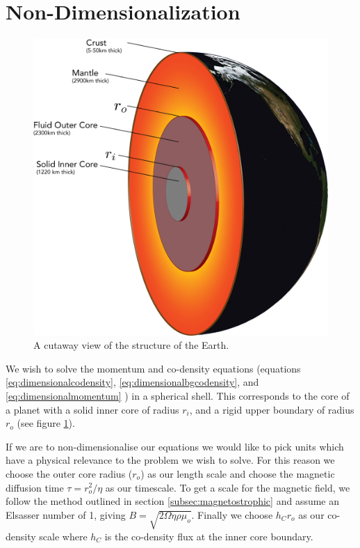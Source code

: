 \section{Non-Dimensionalization}
\begin{figure}
	\centering
	\noindent\includegraphics[width=.6\linewidth]{Chapter2/figures/CutawayEarth.png}
	\caption{A cutaway view of the structure of the Earth.}
	\label{fig:CutawayEarth}
\end{figure}
We wish to solve the momentum and co-density equations (equations \ref{eq:dimensionalcodensity}, \ref{eq:dimensionalbgcodensity}, and \ref{eq:dimensionalmomentum} ) in a spherical shell. This corresponds to the core of a planet with a solid inner core of radius $r_i$, and a rigid upper boundary of radius $r_o$ (see figure \ref{fig:CutawayEarth}). 

If we are to non-dimensionalise our equations we would like to pick units which have a physical relevance to the problem we wish to solve. For this reason we choose the outer core radius ($r_{o}$) as our length scale and choose the magnetic diffusion time $\tau=r_{o}^{2}/\eta$ as our timescale. To get a scale for the magnetic field, we follow the method outlined in section \ref{subsec:magnetostrophic} and assume an Elsasser number of 1, giving $B=\sqrt{2\Omega\eta\rho\mu_{o}}$. Finally we choose $h_{C} r_o$ as our co-density scale where $h_{C}$ is the co-density flux at the inner core boundary.

